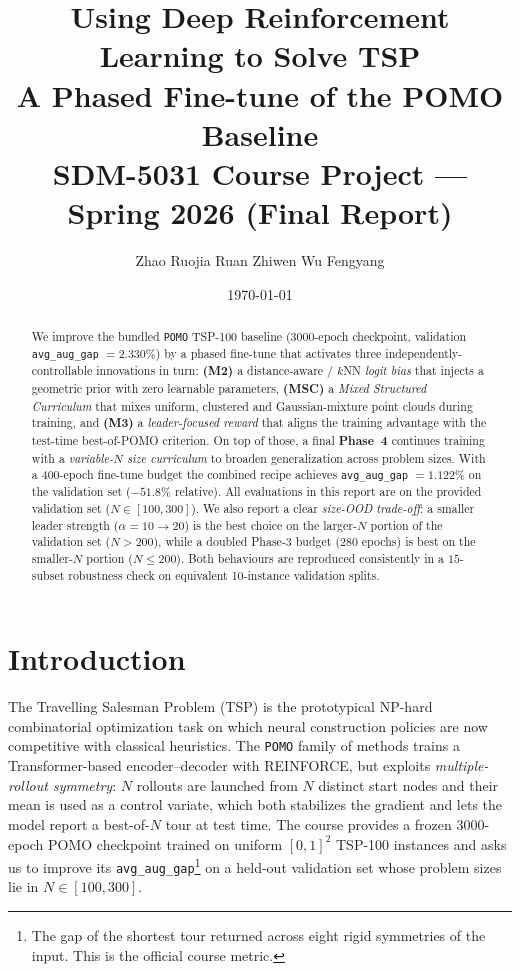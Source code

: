 \documentclass[11pt,a4paper]{article}
\title{\textbf{Using Deep Reinforcement Learning to Solve TSP\\
A Phased Fine-tune of the POMO Baseline}\\
\large SDM-5031 Course Project --- Spring 2026 (Final Report)}
\author{Zhao Ruojia \quad Ruan Zhiwen \quad Wu Fengyang}
\date{\today}
\begin{document}
\maketitle

\begin{abstract}
We improve the bundled \texttt{POMO} TSP-100 baseline (3000-epoch checkpoint, validation
\texttt{avg\_aug\_gap} $=2.330\%$) by a phased fine-tune that activates three
independently-controllable innovations in turn: \textbf{(M2)} a distance-aware /
$k$NN \emph{logit bias} that injects a geometric prior with zero learnable
parameters, \textbf{(MSC)} a \emph{Mixed Structured Curriculum} that mixes
uniform, clustered and Gaussian-mixture point clouds during training, and
\textbf{(M3)} a \emph{leader-focused reward} that aligns the training advantage
with the test-time best-of-POMO criterion. On top of those, a final
\textbf{Phase~4} continues training with a \emph{variable-$N$ size curriculum}
to broaden generalization across problem sizes. With a 400-epoch fine-tune
budget the combined recipe achieves \texttt{avg\_aug\_gap} $=1.122\%$ on the
validation set ($-51.8\%$ relative). All evaluations in this report are on the
provided validation set ($N\!\in\![100,300]$). We also report a clear
\emph{size-OOD trade-off}: a smaller leader strength ($\alpha=10{\to}20$) is
the best choice on the larger-$N$ portion of the validation set ($N>200$),
while a doubled Phase-3 budget (280 epochs) is best on the smaller-$N$
portion ($N\le 200$). Both behaviours are reproduced consistently in a
$15$-subset robustness check on equivalent 10-instance validation splits.
\end{abstract}

\section{Introduction}

The Travelling Salesman Problem (TSP) is the prototypical NP-hard combinatorial
optimization task on which neural construction policies are now competitive
with classical heuristics. The \texttt{POMO} family of methods \cite{POMO}
trains a Transformer-based encoder--decoder with REINFORCE, but exploits
\emph{multiple-rollout symmetry}: $N$ rollouts are launched from $N$ distinct
start nodes and their mean is used as a control variate, which both stabilizes
the gradient and lets the model report a best-of-$N$ tour at test time. The
course provides a frozen 3000-epoch POMO checkpoint trained on uniform
$[0,1]^2$ TSP-100 instances and asks us to improve its
\texttt{avg\_aug\_gap}\footnote{The gap of the shortest tour returned across
eight rigid symmetries of the input. This is the official course metric.}
on a held-out validation set whose problem sizes lie in $N\!\in\![100,300]$.
\end{document}
